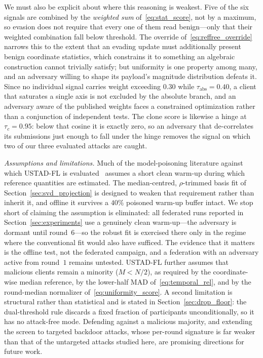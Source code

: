 \documentclass[journal]{IEEEtran}
\begin{document}
We must also be explicit about where this reasoning is weakest. Five of the six signals are combined by the \emph{weighted sum} of~\eqref{eq:stat_score}, not by a maximum, so evasion does not require that every one of them read benign---only that their weighted combination fall below threshold. The override of~\eqref{eq:reffree_override} narrows this to the extent that an evading update must additionally present benign coordinate statistics, which constrains it to something an algebraic construction cannot trivially satisfy; but uniformity is one property among many, and an adversary willing to shape its payload's magnitude distribution defeats it. Since no individual signal carries weight exceeding $0.30$ while $\tau_{\mathrm{abs}} = 0.40$, a client that saturates a single axis is not excluded by the absolute branch, and an adversary aware of the published weights faces a constrained optimization rather than a conjunction of independent tests. The clone score is likewise a hinge at $\tau_c = 0.95$: below that cosine it is exactly zero, so an adversary that de-correlates its submissions just enough to fall under the hinge removes the signal on which two of our three evaluated attacks are caught.

\noindent\textit{Assumptions and limitations.} Much of the model-poisoning literature against which USTAD-FL is evaluated~\cite{baruch2019little, shejwalkar2021manipulating} assumes a short clean warm-up during which reference quantities are estimated. The median-centred, $\rho$-trimmed basis fit of Section~\ref{sec:svd_projection} is designed to weaken that requirement rather than inherit it, and offline it survives a $40\%$ poisoned warm-up buffer intact. We stop short of claiming the assumption is eliminated: all federated runs reported in Section~\ref{sec:experiments} use a genuinely clean warm-up---the adversary is dormant until round~$6$---so the robust fit is exercised there only in the regime where the conventional fit would also have sufficed. The evidence that it matters is the offline test, not the federated campaign, and a federation with an adversary active from round~$1$ remains untested. USTAD-FL further assumes that malicious clients remain a minority ($M < N/2$), as required by the coordinate-wise median reference, by the lower-half MAD of~\eqref{eq:temporal_rel}, and by the round-median normalizer of~\eqref{eq:uniformity_score}. A second limitation is structural rather than statistical and is stated in Section~\ref{sec:drop_floor}: the dual-threshold rule discards a fixed fraction of participants unconditionally, so it has no attack-free mode. Defending against a malicious majority, and extending the screen to targeted backdoor attacks, whose per-round signature is far weaker than that of the untargeted attacks studied here, are promising directions for future work.
\end{document}

